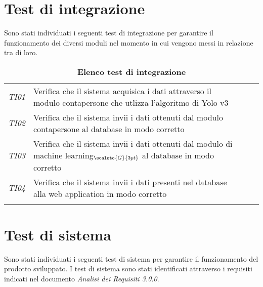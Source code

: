 \section{Test di integrazione}\label{SpecificaDeiTestTestDiIntegrazione}
Sono stati individuati i seguenti test di integrazione per garantire il funzionamento dei diversi moduli nel momento in cui vengono messi in relazione tra di loro.
\def\tabularxcolumn#1{m{#1}}
{

	\begin{center}
		\renewcommand{\arraystretch}{1.4}
		\begin{longtable}{|p{3cm}|p{8cm}|p{2cm}|p{2cm}|}
			\hline
			\rowcolor{airforceblue}
			\makecell[c]{\textbf{Id Test}} & \makecell[c]{\textbf{Descrizione}} & \makecell[c]{\textbf{Esito}} & \makecell[c]{\textbf{Qualità}} \\
			\hline
			\centering \textit{TI01} & Verifica che il sistema acquisica i dati attraverso il modulo contapersone che utlizza l'algoritmo di Yolo v3 & \makecell[tc]{\textit{I}} & \makecell[tc]{\textit{S}} \\
			\hline
			\centering \textit{TI02} & Verifica che il sistema invii i dati ottenuti dal modulo contapersone al database in modo corretto & \makecell[tc]{\textit{I}} & \makecell[tc]{\textit{S}}\\
			\hline
			\centering \textit{TI03} &  Verifica che il sistema invii i dati ottenuti dal modulo di machine learning$_{\scaleto{G}{3pt}}$ al database in modo corretto &\makecell[tc]{\textit{I}} & \makecell[tc]{\textit{S}}\\
			\hline
			\centering \textit{TI04} &  Verifica che il sistema invii i dati presenti nel  database alla web application in modo corretto &\makecell[tc]{\textit{I}} & \makecell[tc]{\textit{S}}\\
			\hline
			\rowcolor{white}
			\caption{\textbf{Elenco test di integrazione}}
		\end{longtable}
	\end{center}

\section{Test di sistema}\label{SpecificaDeiTestTestDiSistema}
Sono stati individuati i seguenti test di sistema per garantire il funzionamento del prodotto sviluppato. I test di sistema sono stati identificati attraverso i requisiti indicati nel documento \textit{Analisi dei Requisiti 3.0.0}.
\def\tabularxcolumn#1{m{#1}}
{

}}
